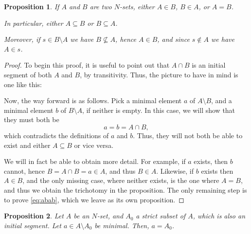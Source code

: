 \documentclass{article}
\newtheorem{prop}{Proposition}
\theoremstyle{nonumberplain}
\newtheorem{proof}{Proof}
\begin{document}
\begin{prop}\label{prop:tri}
If $A$ and $B$ are two $N$-sets, either $A \in B$, $B \in A$, or $A = B$.

In particular, either $A \subseteq B$ or $B \subseteq A$.

Moreover, if $s \in B \setminus A$ we have $B \nsubseteq A$, hence $A \in B$, and since $s \notin A$ we have $A \in s$.
\end{prop}

\begin{proof}
To begin this proof, it is useful to point out that $A \cap B$ is an initial segment of both $A$ and $B$, by transitivity. Thus, the picture to have in mind is one like this:

\begin{figure}[H]
\centering
{}
\end{figure}

Now, the way forward is as follows. Pick a minimal element $a$ of $A \setminus B$, and a minimal element $b$ of $B \setminus A$, if neither is empty. In this case, we will show that they must both be
\begin{equation}\label{eq:abab}
a = b = A \cap B,
\end{equation}
which contradicts the definitions of $a$ and $b$. Thus, they will not both be able to exist and either $A \subseteq B$ or vice versa.

We will in fact be able to obtain more detail. For example, if $a$ exists, then $b$ cannot, hence $B = A \cap B = a \in A$, and thus $B \in A$. Likewise, if $b$ exists then $A \in B$, and the only missing case, where neither exists, is the one where $A = B$, and thus we obtain the trichotomy  in the proposition. The only remaining step is to prove \eqref{eq:abab}, which we leave as its own proposition.
\end{proof}

\begin{prop}
Let $A$ be an $N$-set, and $A_0$ a strict subset of $A$, which is also an initial segment. Let $a \in A \setminus A_0$ be minimal. Then, $a = A_0$.
\end{prop}
\end{document}
